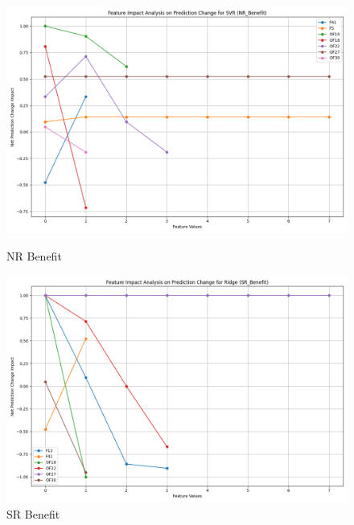 \begin{figure}[H]
    \centering
    \begin{minipage}{0.495\textwidth}
        \centering
        \includegraphics[width=\linewidth]{analysis/images_reg/feature_impact_prediction_change_NR_Benefit_SVR.png}
        \caption{NR Benefit}
        \label{fig:nr_ben_class_analysis_reg}
    \end{minipage}\hfill
    \begin{minipage}{0.495\textwidth}
        \centering
        \includegraphics[width=\linewidth]{analysis/images_reg/feature_impact_prediction_change_SR_Benefit_Ridge.png}
        \caption{SR Benefit}
        \label{fig:sr_ben_class_analysis_reg}
    \end{minipage}
\end{figure}

